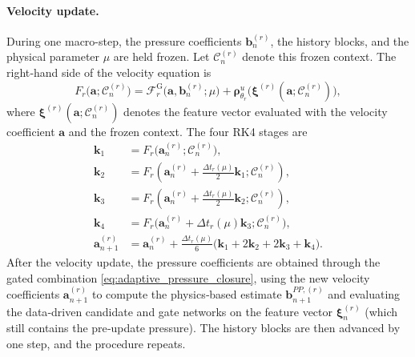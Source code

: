 \paragraph{Velocity update.}
During one macro-step, the pressure coefficients $\boldsymbol{b}^{(r)}_n$,
the history blocks, and the physical parameter $\mu$ are held frozen.
Let $\mathcal{C}^{(r)}_n$ denote this frozen context.  The right‑hand side
of the velocity equation is
\begin{equation}
  F_{r}
  \bigl(
    \boldsymbol{a};
    \mathcal{C}^{(r)}_n
  \bigr)
  =
  \mathscr{F}^{\mathrm{G}}_{r}
  \bigl(
    \boldsymbol{a},
    \boldsymbol{b}^{(r)}_n;
    \mu
  \bigr)
  +
  \boldsymbol{\rho}^{u}_{\theta_r}
  \bigl(
    \boldsymbol{\xi}^{(r)}(\boldsymbol{a};\mathcal{C}^{(r)}_n)
  \bigr),
  \label{eq:frozen_context_rhs}
\end{equation}
where $\boldsymbol{\xi}^{(r)}(\boldsymbol{a};\mathcal{C}^{(r)}_n)$
denotes the feature vector evaluated with the velocity coefficient
$\boldsymbol{a}$ and the frozen context.  The four RK4 stages are
\begin{align}
  \boldsymbol{k}_1
  &= F_{r}\bigl( \boldsymbol{a}^{(r)}_n; \mathcal{C}^{(r)}_n \bigr),
  \nonumber\\
  \boldsymbol{k}_2
  &= F_{r}\left( \boldsymbol{a}^{(r)}_n + \tfrac{\Delta t_r(\mu)}{2}\boldsymbol{k}_1; \mathcal{C}^{(r)}_n \right),
  \nonumber\\
  \boldsymbol{k}_3
  &= F_{r}\left( \boldsymbol{a}^{(r)}_n + \tfrac{\Delta t_r(\mu)}{2}\boldsymbol{k}_2; \mathcal{C}^{(r)}_n \right),
  \nonumber\\
  \boldsymbol{k}_4
  &= F_{r}\bigl( \boldsymbol{a}^{(r)}_n + \Delta t_r(\mu)\boldsymbol{k}_3; \mathcal{C}^{(r)}_n \bigr),
  \nonumber\\
  \boldsymbol{a}^{(r)}_{n+1}
  &=
  \boldsymbol{a}^{(r)}_n
  +
  \frac{\Delta t_r(\mu)}{6}
  \bigl(
    \boldsymbol{k}_1 + 2\boldsymbol{k}_2 + 2\boldsymbol{k}_3 + \boldsymbol{k}_4
  \bigr).
  \label{eq:unified_rk4}
\end{align}
After the velocity update, the pressure coefficients are obtained through
the gated combination
\eqref{eq:adaptive_pressure_closure}, using the new velocity
coefficients $\boldsymbol{a}^{(r)}_{n+1}$ to compute the physics‑based
estimate $\boldsymbol{b}^{PP,(r)}_{n+1}$ and evaluating the data‑driven
candidate and gate networks on the feature vector
$\boldsymbol{\xi}^{(r)}_n$ (which still contains the pre‑update
pressure).  The history blocks are then advanced by one step, and the
procedure repeats.

